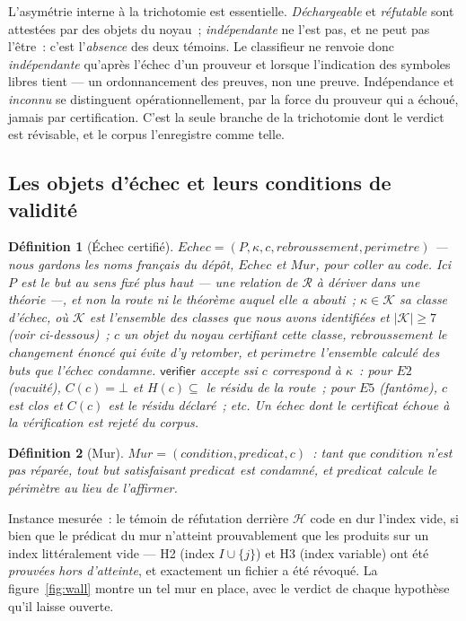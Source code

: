\documentclass[11pt]{article}
\newtheorem{definition}{Définition}
\theoremstyle{remark}\newtheorem{example}{Exemple}
\begin{document}
L'asymétrie interne à la trichotomie est essentielle.
\emph{Déchargeable} et \emph{réfutable} sont attestées par des objets du noyau~;
\emph{indépendante} ne l'est pas, et ne peut pas l'être~: c'est l'\emph{absence} des
deux témoins. Le classifieur ne renvoie donc \emph{indépendante} qu'après l'échec d'un
prouveur et lorsque l'indication des symboles libres tient --- un ordonnancement des
preuves, non une preuve. Indépendance et \emph{inconnu} se distinguent
opérationnellement, par la force du prouveur qui a échoué, jamais par certification.
C'est la seule branche de la trichotomie dont le verdict est révisable, et le corpus
l'enregistre comme telle.

\subsection{Les objets d'échec et leurs conditions de validité}
\begin{definition}[Échec certifié]
$\mathit{Echec} = (P, \kappa, c, \mathit{rebroussement}, \mathit{perimetre})$ --- nous
gardons les noms français du dépôt, $\mathit{Echec}$ et $\mathit{Mur}$, pour coller au
code. Ici $P$ est le \emph{but} au sens fixé plus haut --- une relation de $\mathcal{R}$
à dériver dans une théorie ---, et non la route ni le théorème auquel elle a abouti~;
$\kappa \in \mathcal{K}$ sa classe d'échec, où $\mathcal{K}$ est l'ensemble des classes
que nous avons \emph{identifiées} et $|\mathcal{K}| \ge 7$ (voir ci-dessous)~;
$c$ un objet du noyau certifiant cette classe, $\mathit{rebroussement}$ le
changement énoncé qui évite d'y retomber, et $\mathit{perimetre}$ l'ensemble
\emph{calculé} des buts que l'échec condamne.
$\mathsf{verifier}$ accepte ssi $c$ correspond à $\kappa$~: pour $E2$ (vacuité),
$C(c) = \bot$ et $H(c) \subseteq$ le résidu de la route~; pour $E5$ (fantôme), $c$ est
clos et $C(c)$ \emph{est} le résidu déclaré~; etc. Un échec dont le certificat échoue à
la vérification est \emph{rejeté du corpus}.
\end{definition}

\begin{definition}[Mur] $\mathit{Mur} = (\mathit{condition}, \mathit{predicat}, c)$~:
tant que $\mathit{condition}$ n'est pas réparée, tout but satisfaisant
$\mathit{predicat}$ est condamné, et $\mathit{predicat}$ \emph{calcule} le périmètre au
lieu de l'affirmer.
\end{definition}
Instance mesurée~: le témoin de réfutation derrière $\mathcal{H}$ code en dur l'index
vide, si bien que le prédicat du mur n'atteint prouvablement que les produits sur un
index littéralement vide --- H2 (index $I \cup \{j\}$) et H3 (index variable) ont été
\emph{prouvées hors d'atteinte}, et exactement un fichier a été révoqué. La
figure~\ref{fig:wall} montre un tel mur en place, avec le verdict de chaque
hypothèse qu'il laisse ouverte.
\end{document}
